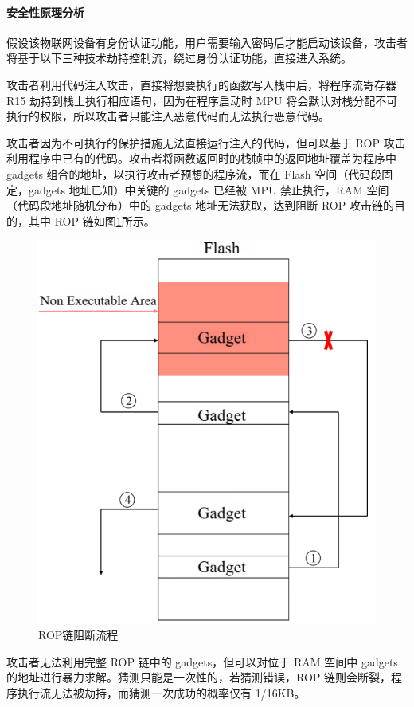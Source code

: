 \documentclass[UTF8,12pt,a4paper]{ctexart}
\numberwithin{figure}{section}
\begin{document}
\paragraph{安全性原理分析}
\par 假设该物联网设备有身份认证功能，用户需要输入密码后才能启动该设备，攻击者将基于以下三种技术劫持控制流，绕过身份认证功能，直接进入系统。
\par 攻击者利用代码注入攻击，直接将想要执行的函数写入栈中后，将程序流寄存器R15 劫持到栈上执行相应语句，因为在程序启动时 MPU 将会默认对栈分配不可执行的权限，所以攻击者只能注入恶意代码而无法执行恶意代码。
\par 攻击者因为不可执行的保护措施无法直接运行注入的代码，但可以基于 ROP 攻击利用程序中已有的代码。攻击者将函数返回时的栈帧中的返回地址覆盖为程序中gadgets 组合的地址，以执行攻击者预想的程序流，而在 Flash 空间（代码段固定，gadgets 地址已知）中关键的 gadgets 已经被 MPU 禁止执行，RAM 空间（代码段地址随机分布）中的 gadgets 地址无法获取，达到阻断 ROP 攻击链的目的，其中 ROP 链如图\ref{ROP blocking process}所示。
\begin{figure}[H]
    \centering
    \includegraphics[scale=0.55]{graph/ROP blocking process.png}
    \caption{ROP链阻断流程}
    \label{ROP blocking process}
\end{figure}
\par 攻击者无法利用完整 ROP 链中的 gadgets，但可以对位于 RAM 空间中 gadgets 的地址进行暴力求解。猜测只能是一次性的，若猜测错误，ROP 链则会断裂，程序执行流无法被劫持，而猜测一次成功的概率仅有 1/16KB。
\end{document}
